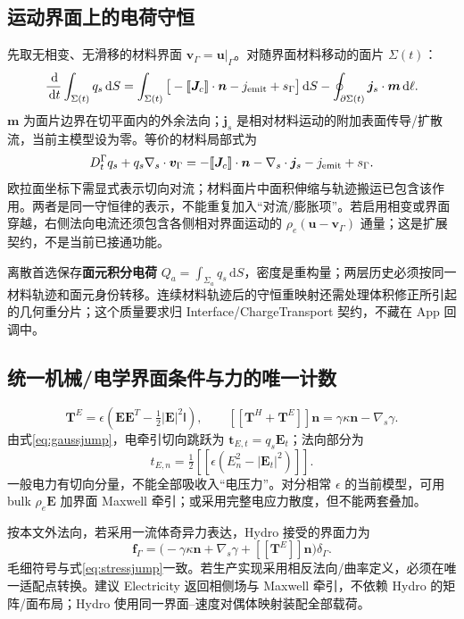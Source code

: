 \documentclass[UTF8,a4paper,11pt,fontset=fandol]{ctexart}
\numberwithin{equation}{section}
\newcommand{\dd}{\,\mathrm{d}}
\newcommand{\uu}{\bm u}
\newcommand{\nn}{\bm n}
\newcommand{\EE}{\bm E}
\newcommand{\JJ}{\bm J}
\newcommand{\jump}[1]{[\![#1]\!]}
\newcommand{\mat}[1]{\mathsf{#1}}
\begin{document}
\subsection{运动界面上的电荷守恒}\label{sec:surfacecharge}
先取无相变、无滑移的材料界面 $\bm v_\Gamma=\uu|_\Gamma$。对随界面材料移动的面片 $\Sigma(t)$：
\begin{equation}
 \frac{\dd}{\dd t}\int_{\Sigma(t)}q_s\dd S
 =\int_{\Sigma(t)}\big[-\jump{\JJ_c}\cdot\nn-j_{\rm emit}+s_\Gamma\big]\dd S
 -\oint_{\partial\Sigma(t)}\bm j_s\cdot\bm m\dd\ell.\label{eq:surfaceintegral}
\end{equation}
$\bm m$ 为面片边界在切平面内的外余法向；$\bm j_s$ 是相对材料运动的附加表面传导/扩散流，当前主模型设为零。等价的材料局部式为
\begin{equation}
 D_t^\Gamma q_s+q_s\nabla_s\cdot\bm v_\Gamma
 =-\jump{\JJ_c}\cdot\nn-\nabla_s\cdot\bm j_s-j_{\rm emit}+s_\Gamma.\label{eq:surfacelocal}
\end{equation}
欧拉面坐标下需显式表示切向对流；材料面片中面积伸缩与轨迹搬运已包含该作用。两者是同一守恒律的表示，不能重复加入“对流/膨胀项”。若启用相变或界面穿越，右侧法向电流还须包含各侧相对界面运动的 $\rho_e(\uu-\bm v_\Gamma)$ 通量；这是扩展契约，不是当前已接通功能。

离散首选保存\textbf{面元积分电荷} $Q_a=\int_{\Sigma_a}q_s\dd S$，密度是重构量；两层历史必须按同一材料轨迹和面元身份转移。连续材料轨迹后的守恒重映射还需处理体积修正所引起的几何重分片；这个质量要求归 Interface/ChargeTransport 契约，不藏在 App 回调中。

\subsection{统一机械/电学界面条件与力的唯一计数}\label{sec:traction}
\begin{equation}
 \bm T^E=\epsilon\left(\EE\EE^T-\tfrac12|\EE|^2\mat I\right),\qquad
 \jump{\bm T^H+\bm T^E}\nn=\gamma\kappa\nn-\nabla_s\gamma.\label{eq:stressjump}
\end{equation}
由式\eqref{eq:gaussjump}，电牵引切向跳跃为 $\bm t_{E,t}=q_s\EE_t$；法向部分为
\begin{equation}
 t_{E,n}=\tfrac12\jump{\epsilon(E_n^2-|\EE_t|^2)}.
\end{equation}
一般电力有切向分量，不能全部吸收入“电压力”。对分相常 $\epsilon$ 的当前模型，可用 bulk $\rho_e\EE$ 加界面 Maxwell 牵引；或采用完整电应力散度，但不能两套叠加。

按本文外法向，若采用一流体奇异力表达，Hydro 接受的界面力为
\begin{equation}
 \bm f_\Gamma=\big(-\gamma\kappa\nn+\nabla_s\gamma+
 \jump{\bm T^E}\nn\big)\delta_\Gamma.\label{eq:surfaceforce}
\end{equation}
毛细符号与式\eqref{eq:stressjump}一致。若生产实现采用相反法向/曲率定义，必须在唯一适配点转换。建议 Electricity 返回相侧场与 Maxwell 牵引，不依赖 Hydro 的矩阵/面布局；Hydro 使用同一界面--速度对偶体映射装配全部载荷。
\end{document}
